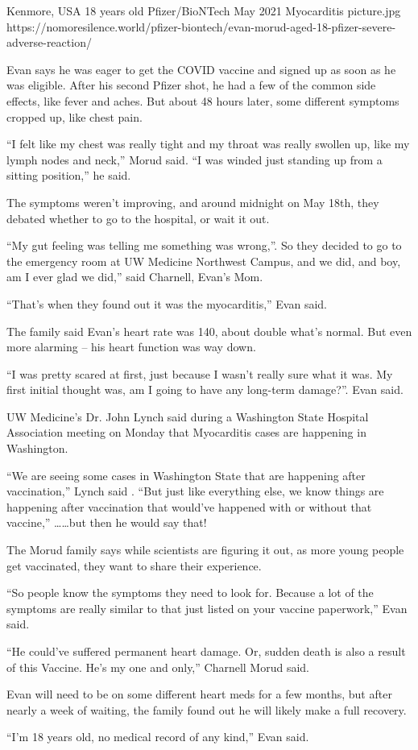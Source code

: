 {Kenmore, USA}
{18 years old}
{Pfizer/BioNTech}
{May 2021}
{Myocarditis}
{picture.jpg}
{https://nomoresilence.world/pfizer-biontech/evan-morud-aged-18-pfizer-severe-adverse-reaction/}
{

Evan says he was eager to get the COVID vaccine and signed up as soon as he was
eligible. After his second Pfizer shot, he had a few of the common side effects,
like fever and aches. But about 48 hours later, some different symptoms cropped
up, like chest pain.

“I felt like my chest was really tight and my throat was really swollen up, like
my lymph nodes and neck,” Morud said. “I was winded just standing up from a
sitting position,” he said.

The symptoms weren’t improving, and around midnight on May 18th, they debated
whether to go to the hospital, or wait it out.

“My gut feeling was telling me something was wrong,”. So they decided to go to
the emergency room at UW Medicine Northwest Campus, and we did, and boy, am I
ever glad we did,” said Charnell, Evan’s Mom.

“That’s when they found out it was the myocarditis,” Evan said.

The family said Evan’s heart rate was 140, about double what’s normal. But even
more alarming – his heart function was way down.

“I was pretty scared at first, just because I wasn’t really sure what it was. My
first initial thought was, am I going to have any long-term damage?”. Evan said.

UW Medicine’s Dr. John Lynch said during a Washington State Hospital Association
meeting on Monday that Myocarditis cases are happening in Washington.

“We are seeing some cases in Washington State that are happening after
vaccination,” Lynch said . “But just like everything else, we know things are
happening after vaccination that would’ve happened with or without that
vaccine,” ……but then he would say that!

The Morud family says while scientists are figuring it out, as more young people get vaccinated, they want to share their experience.

“So people know the symptoms they need to look for. Because a lot of the
symptoms are really similar to that just listed on your vaccine paperwork,” Evan
said.

“He could’ve suffered permanent heart damage. Or, sudden death is also a result
of this Vaccine. He’s my one and only,” Charnell Morud said.

Evan will need to be on some different heart meds for a few months, but after
nearly a week of waiting, the family found out he will likely make a full
recovery.

“I’m 18 years old, no medical record of any kind,” Evan said.

}
